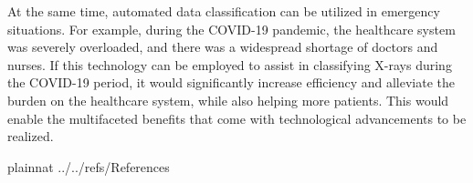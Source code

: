 \documentclass[12pt]{article}
\begin{document}
At the same time, automated data classification can be utilized in emergency situations. For example, during the COVID-19 pandemic, the healthcare system was severely overloaded, and there was a widespread shortage of doctors and nurses. If this technology can be employed to assist in classifying X-rays during the COVID-19 period, it would significantly increase efficiency and alleviate the burden on the healthcare system, while also helping more patients. This would enable the multifaceted benefits that come with technological advancements to be realized. \\

\newpage


 {plainnat}
 {../../refs/References}
\end{document}
